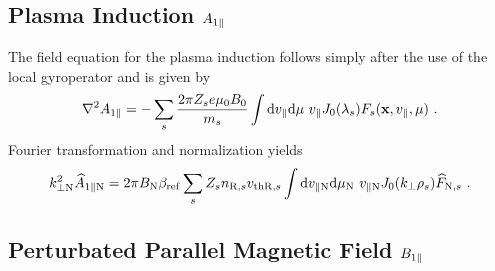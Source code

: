 \subsection*{Plasma Induction $A_{1\parallel}$}
\label{sub:fieldInductionLocal}

The field equation for the plasma induction follows simply after the use of the local gyroperator and is given by
\begin{gather}
	\nabla^2 A_{1\parallel} = - \sum_s \frac{2\pi Z_se \mu_0 B_0}{m_s}  \int \mathrm{d}v_\parallel\mathrm{d}\mu ~ v_\parallel J_0(\lambda_s) F_s(\boldsymbol{\mathbf{x}}, v_\parallel, \mu)~.
	\label{eq:fieldInductionLocal}
\end{gather}
Fourier transformation and normalization yields
\begin{gather}
	k_{\perp \mathrm{N}}^2 \widehat{A}_{1\parallel \mathrm{N}} = 2 \pi B_\mathrm{N} \beta_\mathrm{ref}\sum_s Z_s n_{\mathrm{R},s} v_{\mathrm{th}\mathrm{R},s} \int \mathrm{d}v_{\parallel \mathrm{N}}\mathrm{d}\mu_\mathrm{N} ~ v_{\parallel \mathrm{N}} J_0(k_\perp \rho_s) \widehat{F}_{\mathrm{N},s}~.
	\label{eq:fieldInductionLocalNorm}
\end{gather}

\subsection*{Perturbated Parallel Magnetic Field $B_{1\parallel}$}
\label{sub:fieldMagneticLocal}


